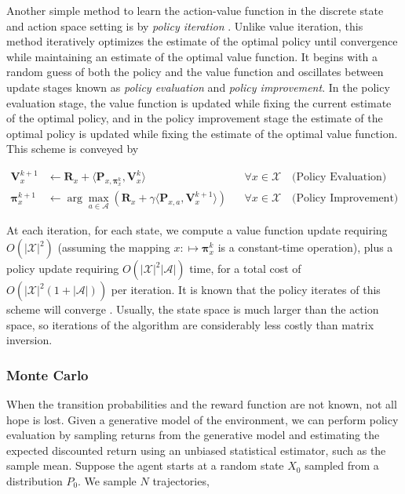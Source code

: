 Another simple method to learn
the action-value function in the discrete state and action space setting is by
\emph{policy iteration} \citep{howard1960dynamic}. Unlike value iteration,
this method iteratively optimizes the estimate of the optimal policy until
convergence while maintaining an estimate of the optimal value function. It
begins with a random guess of both the policy and the value function and
oscillates between update stages known as \emph{policy evaluation} and
\emph{policy improvement}. In the policy evaluation stage, the value function is
updated while fixing the current estimate of the optimal policy, and in the
policy improvement stage the estimate of the optimal policy is updated while
fixing the estimate of the optimal value function. This scheme is conveyed by

\begin{align}
  \pmb{V}^{k+1}_x &\leftarrow \pmb{R}_x + \langle\pmb{P}_{x, \pmb{\pi}^k_x},
  \pmb{V}_x^k\rangle && \forall x\in\mathcal{X}\quad\text{(Policy Evaluation)}\label{eq:policy-evaluation}\\
  \pmb{\pi}^{k+1}_{x} &\leftarrow \arg\max_{a\in\mathcal{A}}\left(\pmb{R}_x +
    \gamma\langle\pmb{P}_{x,a},
    \pmb{V}^{k+1}_x\rangle\right) && \forall x\in\mathcal{X}\quad\text{(Policy
  Improvement)}\label{eq:policy-improvement}
\end{align}

At each iteration, for each state, we compute a value function update requiring
$O(|\mathcal{X}|^2)$ (assuming the mapping $x:\mapsto\pmb{\pi}^k_x$ is a
constant-time operation), plus a policy
update requiring $O(|\mathcal{X}|^2|\mathcal{A}|)$ time, for a total cost of
$O(|\mathcal{X}|^2(1 + |\mathcal{A}|))$ per iteration. It is known that the
policy iterates of this scheme will converge \citep{puterman1979convergence}.
Usually, the
state space is much larger than the action space, so iterations of the
algorithm are considerably less costly than matrix inversion.

\subsubsection{Monte Carlo}
When the transition probabilities and the reward function are not
known, not all hope is lost. Given a generative model of the
environment, we can perform policy evaluation by sampling returns from
the generative model and estimating the expected discounted return
using an unbiased statistical estimator, such as the sample
mean. Suppose the agent starts at a random state $X_0$ sampled from a
distribution $P_0$. We sample $N$ trajectories,

